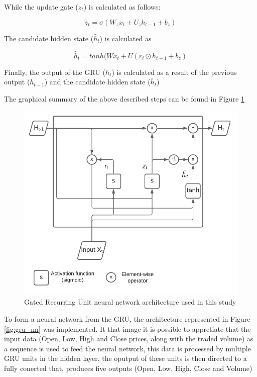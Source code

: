 \documentclass[10pt,twocolumn,letterpaper]{article}
\begin{document}
While the update gate ($z_t$) is calculated as follows:

\begin{equation}
	z_t = \sigma (W_z x_t + U_z h_{t-1} + b_z) 
\end{equation}

The candidate hidden state ($\tilde{h_t}$) is calculated as 

\begin{equation}
	\tilde{h_t} = tanh(W x_t + U (r_t \odot h_{t-1} + b_z) 
\end{equation}

Finally, the output of the GRU ($h_t$) is calculated as a result of the previous output ($h_{t-1}$) and the candidate hidden state ($\tilde{h_t}$) 

The graphical summary of the above described steps can be found in Figure \ref{fig:gru} 

\begin{figure}[h]
	\begin{center}
		\includegraphics[width=1.0\linewidth]{GRU.pdf}
	\end{center}
	\caption{Gated Recurring Unit neural network architecture used in this study}
	\label{fig:gru}
\end{figure}

To form a neural network from the GRU, the architecture represented in Figure \ref{fig:gru_nn} was implemented. It that image it is possible to appretiate that the input data (Open, Low, High and Close prices, along with the traded volume) as a sequence is used to feed the neural network, this data is processed by multiple GRU units in the hidden layer, the oputput of these units is then directed to a fully conected that, produces five outputs (Open, Low, High, Close and Volume)
\end{document}
